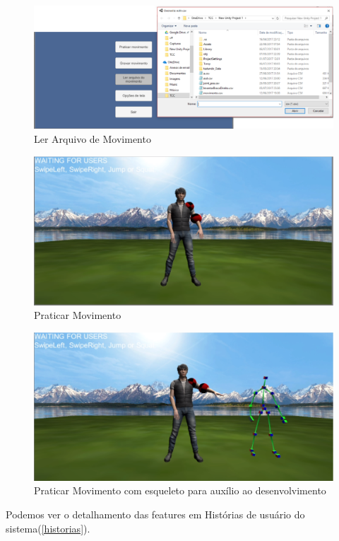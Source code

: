      \begin{figure}[H]
     \centering
     \includegraphics [keepaspectratio=true,scale=0.40]{figuras/lerarquivo.eps}
     \caption{Ler Arquivo de Movimento}
     \label{img:lerArquivo}
     \end{figure}

     \begin{figure}[H]
     \centering
     \includegraphics [keepaspectratio=true,scale=0.40]{figuras/praticarmovimento.eps}
     \caption{Praticar Movimento}
     \label{img:praticarMovimento}
     \end{figure}

     \begin{figure}[H]
     \centering
     \includegraphics [keepaspectratio=true,scale=0.40]{figuras/praticarmovimento2.eps}
     \caption{Praticar Movimento com esqueleto para auxílio ao desenvolvimento}
     \label{img2:praticarMovimento}
     \end{figure}


   Podemos ver o detalhamento das features em Histórias de usuário do sistema(\ref{historias}).
